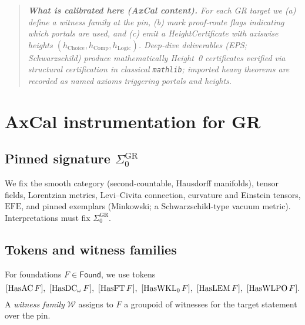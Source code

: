 \documentclass[11pt]{article}
\newenvironment{mdframed}[1][]{\begin{quote}\itshape}{\end{quote}}
\theoremstyle{definition}
\theoremstyle{remark}
\newcommand{\Found}{\mathsf{Found}}
\newcommand{\SigmaZero}{\Sigma_{0}}
\newcommand{\hChoice}{h_{\mathrm{Choice}}}    %
\newcommand{\hComp}{h_{\mathrm{Comp}}}        %
\newcommand{\hLogic}{h_{\mathrm{Logic}}}      %
\newcommand{\EFE}{\mathrm{EFE}} %
\begin{document}
\begin{mdframed}[style=status]
\textbf{What is calibrated here (AxCal content).}
For each GR target we (a) define a \emph{witness family} at the pin, (b) mark \emph{proof‑route flags} indicating which portals are used, and (c) emit a \emph{HeightCertificate} with axiswise heights $(\hChoice,\hComp,\hLogic)$. Deep‑dive deliverables (EPS; Schwarzschild) produce mathematically Height~0 certificates verified via structural certification in classical \texttt{mathlib}; imported heavy theorems are recorded as \emph{named axioms} triggering portals and heights.
\end{mdframed}

\tableofcontents

\section{AxCal instrumentation for GR}
\subsection{Pinned signature \texorpdfstring{$\Sigma_0^{\mathrm{GR}}$}{Sigma0-GR}}
We fix the smooth category (second-countable, Hausdorff manifolds), tensor fields, Lorentzian metrics, Levi--Civita connection, curvature and Einstein tensors, $\EFE$, and pinned exemplars (Minkowski; a Schwarzschild-type vacuum metric). Interpretations must fix $\SigmaZero^{\mathrm{GR}}$.

\subsection{Tokens and witness families}
For foundations $F\in\Found$, we use tokens
\[
[{\rm HasAC}\,F],\ [{\rm HasDC}_{\omega}\,F],\ [{\rm HasFT}\,F],\ [{\rm HasWKL}_0\,F],\ [{\rm HasLEM}\,F],\ [{\rm HasWLPO}\,F].
\]
A \emph{witness family} $\mathcal{W}$ assigns to $F$ a groupoid of witnesses for the target statement over the pin.
\end{document}
